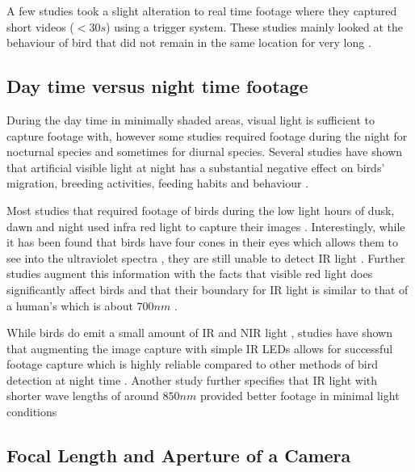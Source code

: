 \documentclass[class=report,11pt,crop=false]{standalone}
\begin{document}
A few studies took a slight alteration to real time footage where they captured short videos ($<30s$) using a trigger system. These studies mainly looked at the behaviour of bird that did not remain in the same location for very long \cite{CAMInexpensiveRPVideo} \cite{CAMBirdCollisions}. 

\subsection{Day time versus night time footage}

During the day time in minimally shaded areas, visual light is sufficient to capture footage with, however some studies required footage during the night for nocturnal species and sometimes for diurnal species. Several studies have shown that artificial visible light at night has a substantial negative effect on birds' migration, breeding activities, feeding habits and behaviour \cite{CAMNightLights1} \cite{CAMNightLights2} \cite{CAMNightLights3} \cite{CAMNightLightsRed}. 

Most studies that required footage of birds during the low light hours of dusk, dawn and night used infra red light to capture their images \cite{CAMDevelopmentOfNestMonitoring} \cite{CAMIRCam} \cite{CAMIRCamComparrisson}. Interestingly, while it has been found that birds have four cones in their eyes which allows them to see into the ultraviolet spectra \cite{CAMBirdSeeNoIR} \cite{CAMBirdSeeUV}, they are still unable to detect \acrfull{IR} light \cite{CAMBirdSeeNoIR}. Further studies augment this information with the facts that visible red light does significantly affect birds \cite{CAMNightLightsRed} and that their boundary for \acrshort{IR} light is similar to that of a human's \cite{CAMBirdSeeNoIR} which is about $700 nm$ \cite{CAMHumanIRLimit}. 

While birds do emit a small amount of \acrlong{IR} and \acrlong{NIR} light \cite{CAMBirdEmitIR}, studies have shown that augmenting the image capture with simple \acrshort{IR} \acrshort{LEDs} allows for successful footage capture which is highly reliable compared to other methods of bird detection at night time \cite{CAMIRCamComparrisson} \cite{CAMIRCam}. Another study further specifies that \acrshort{IR} light with shorter wave lengths of around $850 nm$ provided better footage in minimal light conditions \cite{CAMDevelopmentOfNestMonitoring}

\subsection{Focal Length and Aperture of a Camera} 
\end{document}
